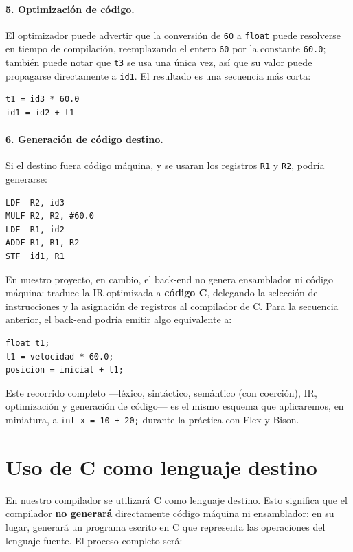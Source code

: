 \documentclass[11pt,a4paper]{article}
\begin{document}
\paragraph{5. Optimización de código.} El optimizador puede advertir que la conversión de
\texttt{60} a \texttt{float} puede resolverse en tiempo de compilación, reemplazando el entero
\texttt{60} por la constante \texttt{60.0}; también puede notar que \texttt{t3} se usa una
única vez, así que su valor puede propagarse directamente a \texttt{id1}. El resultado es una
secuencia más corta:

\begin{lstlisting}
t1 = id3 * 60.0
id1 = id2 + t1
\end{lstlisting}

\paragraph{6. Generación de código destino.} Si el destino fuera código máquina, y se usaran los
registros \texttt{R1} y \texttt{R2}, podría generarse:

\begin{lstlisting}
LDF  R2, id3
MULF R2, R2, #60.0
LDF  R1, id2
ADDF R1, R1, R2
STF  id1, R1
\end{lstlisting}

En nuestro proyecto, en cambio, el back-end no genera ensamblador ni código máquina: traduce la
IR optimizada a \textbf{código C}, delegando la selección de instrucciones y la asignación de
registros al compilador de C. Para la secuencia anterior, el back-end podría emitir algo
equivalente a:

\begin{lstlisting}
float t1;
t1 = velocidad * 60.0;
posicion = inicial + t1;
\end{lstlisting}

Este recorrido completo —léxico, sintáctico, semántico (con coerción), IR, optimización y
generación de código— es el mismo esquema que aplicaremos, en miniatura, a
\texttt{int x = 10 + 20;} durante la práctica con Flex y Bison.

\section{Uso de C como lenguaje destino}
\label{sec:c-destino}

En nuestro compilador se utilizará \textbf{C} como lenguaje destino. Esto significa que el
compilador \textbf{no generará} directamente código máquina ni ensamblador: en su lugar,
generará un programa escrito en C que representa las operaciones del lenguaje fuente. El
proceso completo será:
\end{document}

